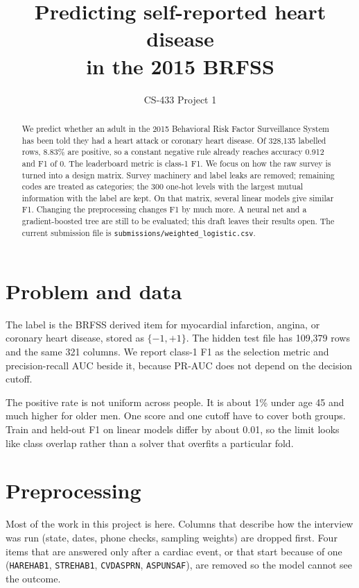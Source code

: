 \documentclass[10pt,conference,compsocconf]{IEEEtran}
\begin{document}
\title{Predicting self-reported heart disease\\ in the 2015 BRFSS}

\author{CS-433 Project 1}

\maketitle

\begin{abstract}
We predict whether an adult in the 2015 Behavioral Risk Factor Surveillance System
has been told they had a heart attack or coronary heart disease.
Of 328{,}135 labelled rows, 8.83\% are positive, so a constant negative rule already
reaches accuracy 0.912 and F1 of 0.
The leaderboard metric is class-1 F1.
We focus on how the raw survey is turned into a design matrix.
Survey machinery and label leaks are removed; remaining codes are treated as
categories; the 300 one-hot levels with the largest mutual information with the
label are kept.
On that matrix, several linear models give similar F1.
Changing the preprocessing changes F1 by much more.
A neural net and a gradient-boosted tree are still to be evaluated; this draft
leaves their results open.
The current submission file is \texttt{submissions/weighted\_logistic.csv}.
\end{abstract}

\section{Problem and data}
The label is the BRFSS derived item for myocardial infarction, angina, or coronary
heart disease, stored as $\{-1,+1\}$.
The hidden test file has 109{,}379 rows and the same 321 columns.
We report class-1 F1 as the selection metric and precision-recall AUC beside it,
because PR-AUC does not depend on the decision cutoff.

The positive rate is not uniform across people.
It is about 1\% under age 45 and much higher for older men.
One score and one cutoff have to cover both groups.
Train and held-out F1 on linear models differ by about 0.01, so the limit looks
like class overlap rather than a solver that overfits a particular fold.

\section{Preprocessing}
Most of the work in this project is here.
Columns that describe how the interview was run (state, dates, phone checks,
sampling weights) are dropped first.
Four items that are answered only after a cardiac event, or that start because
of one (\texttt{HAREHAB1}, \texttt{STREHAB1}, \texttt{CVDASPRN}, \texttt{ASPUNSAF}),
are removed so the model cannot see the outcome.
\end{document}
